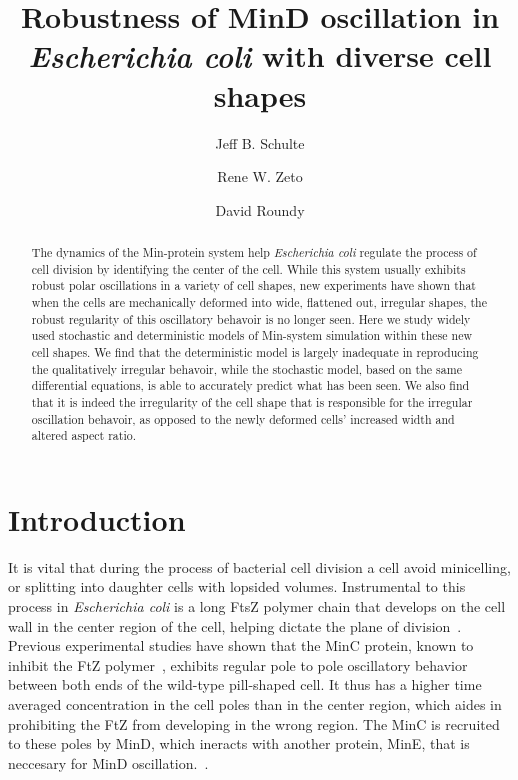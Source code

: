 \documentclass[letterpaper,twocolumn,amsmath,amssymb,pre]{revtex4-1}
\newcommand{\red}[1]{{\bf \color{red} #1}}
\newcommand{\fixme}[1]{\red{[#1]}}
\begin{document}
\title{Robustness of MinD oscillation in \emph{Escherichia coli} with
  diverse cell shapes}

\author{Jeff B. Schulte}
\author{Rene W. Zeto}
\author{David Roundy}

\begin{abstract}
  The dynamics of the Min-protein system help \emph{Escherichia coli}
  regulate the process of cell division by identifying the center of
  the cell.  While this system usually exhibits robust polar
  oscillations in a variety of cell shapes, new experiments have shown
  that when the cells are mechanically deformed into wide, flattened
  out, irregular shapes, the robust regularity of this oscillatory
  behavoir is no longer seen. Here we study widely used stochastic and
  deterministic models of Min-system simulation within these new cell
  shapes.  We find that the deterministic model is largely inadequate
  in reproducing the qualitatively irregular behavoir, while the
  stochastic model, based on the same differential equations, is able
  to accurately predict what has been seen.  We also find that it is
  indeed the irregularity of the cell shape that is responsible for
  the irregular oscillation behavoir, as opposed to the newly deformed
  cells' increased width and altered aspect ratio.
\end{abstract}

\maketitle

\section{Introduction}
It is vital that during the process of bacterial cell division a cell
avoid minicelling, or splitting into daughter cells with lopsided
volumes.  Instrumental to this process in \emph{Escherichia coli} is a
long FtsZ polymer chain that develops on the cell wall in the center
region of the cell, helping dictate the plane of
division~\cite{adams2009bacterial, lutkenhaus2007assembly}. Previous
experimental studies have shown that the MinC protein, known to
inhibit the FtZ polymer~\cite{shen2010examination}, exhibits regular
pole to pole oscillatory behavior between both ends of the wild-type
pill-shaped cell.  It thus has a higher time averaged concentration in
the cell poles than in the center region, which aides in prohibiting
the FtZ from developing in the wrong region.  The MinC is recruited to
these poles by MinD, which ineracts with another protein, MinE, that
is neccesary for MinD oscillation.~\cite{hu1999topological,
  fu2001mine, shapiro2009and, yu1999ftsz, raskin1999rapid,
  meacci2005min, raskin1999minde}.
\end{document}
